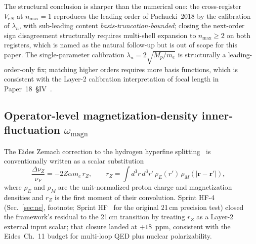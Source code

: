 \documentclass[twocolumn,prc,amsmath,amssymb,superscriptaddress]{revtex4-2}
\begin{document}
The structural conclusion is sharper than the numerical one: the
cross-register $V_{eN}$ at $n_{\max} = 1$ reproduces the leading order
of Pachucki~2018 by the calibration of $\lambda_n$, with sub-leading content
\emph{basis-truncation-bounded}; closing the next-order sign
disagreement structurally requires multi-shell expansion to
$n_{\max} \geq 2$ on both registers, which is named as the natural
follow-up but is out of scope for this paper. The single-parameter
calibration $\lambda_n = 2\sqrt{M_p / m_e}$ is structurally a
leading-order-only fix; matching higher orders requires more basis
functions, which is consistent with the Layer-2 calibration
interpretation of focal length in Paper~18~\S IV~\cite{Paper18}.

\subsection{Operator-level magnetization-density inner-fluctuation
$\omega_{\mathrm{magn}}$}
\label{ssec:omega-magn}

The Eides Zemach correction to the hydrogen hyperfine
splitting~\cite{EidesGrotchShelyuto2007} is conventionally
written as a scalar substitution
\begin{equation}
  \frac{\Delta\nu_Z}{\nu_F}
  = -2 Z \alpha m_e\, r_Z,
\qquad
  r_Z = \int d^3 r\, d^3 r'\,
        \rho_E(r')\, \rho_M(|\mathbf{r} - \mathbf{r}'|),
\label{eq:eides-zemach}
\end{equation}
where $\rho_E$ and $\rho_M$ are the unit-normalized proton charge and
magnetization densities and $r_Z$ is the first moment of their
convolution. Sprint HF-4 (Sec.~\ref{sec:ne}, footnote;
Sprint HF~\cite{SprintHF} for the original 21\,cm precision test) closed
the framework's residual to the 21\,cm transition by treating $r_Z$ as
a Layer-2 external input scalar; that closure landed at $+18$~ppm,
consistent with the Eides~Ch.~11 budget for multi-loop QED plus
nuclear polarizability.
\end{document}
